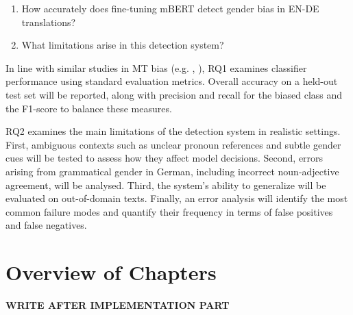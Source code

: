     \begin{enumerate}[label=\textbf{RQ\arabic*:}]
    \item How accurately does fine-tuning mBERT detect gender bias in EN-DE translations?
    \item What limitations arise in this detection system?
    \end{enumerate}

    In line with similar studies in MT bias (e.g. \textcite{smacchiaDoesAIReflect2024}, \textcite{rescignoGenderBiasMachine2023}), RQ1 examines classifier performance using standard evaluation metrics. Overall accuracy on a held-out test set will be reported, along with precision and recall for the biased class and the F1-score to balance these measures. 
    
    RQ2 examines the main limitations of the detection system in realistic settings. First, ambiguous contexts such as unclear pronoun references and subtle gender cues will be tested to assess how they affect model decisions. Second, errors arising from grammatical gender in German, including incorrect noun-adjective agreement, will be analysed. Third, the system’s ability to generalize will be evaluated on out-of-domain texts. Finally, an error analysis will identify the most common failure modes and quantify their frequency in terms of false positives and false negatives.

\section{Overview of Chapters}
\textbf{WRITE AFTER IMPLEMENTATION PART}
